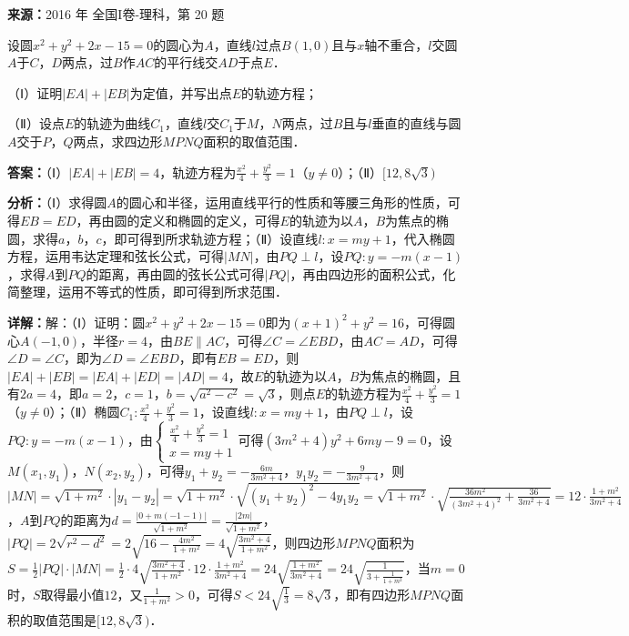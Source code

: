 \begin{question}[points=12]
\textbf{来源：}2016 年 全国I卷-理科，第 20 题\par
设圆$x^2+y^2+2x-15=0$的圆心为$A$，直线$l$过点$B(1,0)$且与$x$轴不重合，$l$交圆$A$于$C$，$D$两点，过$B$作$AC$的平行线交$AD$于点$E$．

（Ⅰ）证明$|EA|+|EB|$为定值，并写出点$E$的轨迹方程；

（Ⅱ）设点$E$的轨迹为曲线$C_1$，直线$l$交$C_1$于$M$，$N$两点，过$B$且与$l$垂直的直线与圆$A$交于$P$，$Q$两点，求四边形$MPNQ$面积的取值范围．
\begin{solution}
\textbf{答案：}（Ⅰ）$|EA|+|EB|=4$，轨迹方程为$\frac{x^2}{4}+\frac{y^2}{3}=1$（$y\neq0$）；（Ⅱ）$[12,8\sqrt{3})$

\textbf{分析：}（Ⅰ）求得圆$A$的圆心和半径，运用直线平行的性质和等腰三角形的性质，可得$EB=ED$，再由圆的定义和椭圆的定义，可得$E$的轨迹为以$A$，$B$为焦点的椭圆，求得$a$，$b$，$c$，即可得到所求轨迹方程；（Ⅱ）设直线$l:x=my+1$，代入椭圆方程，运用韦达定理和弦长公式，可得$|MN|$，由$PQ\perp l$，设$PQ:y=-m(x-1)$，求得$A$到$PQ$的距离，再由圆的弦长公式可得$|PQ|$，再由四边形的面积公式，化简整理，运用不等式的性质，即可得到所求范围．

\textbf{详解：}解：（Ⅰ）证明：圆$x^2+y^2+2x-15=0$即为$(x+1)^2+y^2=16$，可得圆心$A(-1,0)$，半径$r=4$，由$BE\parallel AC$，可得$\angle C=\angle EBD$，由$AC=AD$，可得$\angle D=\angle C$，即为$\angle D=\angle EBD$，即有$EB=ED$，则$|EA|+|EB|=|EA|+|ED|=|AD|=4$，故$E$的轨迹为以$A$，$B$为焦点的椭圆，且有$2a=4$，即$a=2$，$c=1$，$b=\sqrt{a^2-c^2}=\sqrt{3}$，则点$E$的轨迹方程为$\frac{x^2}{4}+\frac{y^2}{3}=1$（$y\neq0$）；（Ⅱ）椭圆$C_1:\frac{x^2}{4}+\frac{y^2}{3}=1$，设直线$l:x=my+1$，由$PQ\perp l$，设$PQ:y=-m(x-1)$，由$\begin{cases}\frac{x^2}{4}+\frac{y^2}{3}=1\\x=my+1\end{cases}$可得$(3m^2+4)y^2+6my-9=0$，设$M(x_1,y_1)$，$N(x_2,y_2)$，可得$y_1+y_2=-\frac{6m}{3m^2+4}$，$y_1y_2=-\frac{9}{3m^2+4}$，则$|MN|=\sqrt{1+m^2}\cdot|y_1-y_2|=\sqrt{1+m^2}\cdot\sqrt{(y_1+y_2)^2-4y_1y_2}=\sqrt{1+m^2}\cdot\sqrt{\frac{36m^2}{(3m^2+4)^2}+\frac{36}{3m^2+4}}=12\cdot\frac{1+m^2}{3m^2+4}$，$A$到$PQ$的距离为$d=\frac{|0+m(-1-1)|}{\sqrt{1+m^2}}=\frac{|2m|}{\sqrt{1+m^2}}$，$|PQ|=2\sqrt{r^2-d^2}=2\sqrt{16-\frac{4m^2}{1+m^2}}=4\sqrt{\frac{3m^2+4}{1+m^2}}$，则四边形$MPNQ$面积为$S=\frac{1}{2}|PQ|\cdot|MN|=\frac{1}{2}\cdot4\sqrt{\frac{3m^2+4}{1+m^2}}\cdot12\cdot\frac{1+m^2}{3m^2+4}=24\sqrt{\frac{1+m^2}{3m^2+4}}=24\sqrt{\frac{1}{3+\frac{1}{1+m^2}}}$，当$m=0$时，$S$取得最小值$12$，又$\frac{1}{1+m^2}>0$，可得$S<24\sqrt{\frac{1}{3}}=8\sqrt{3}$，即有四边形$MPNQ$面积的取值范围是$[12,8\sqrt{3})$．
\end{solution}
\end{question}

